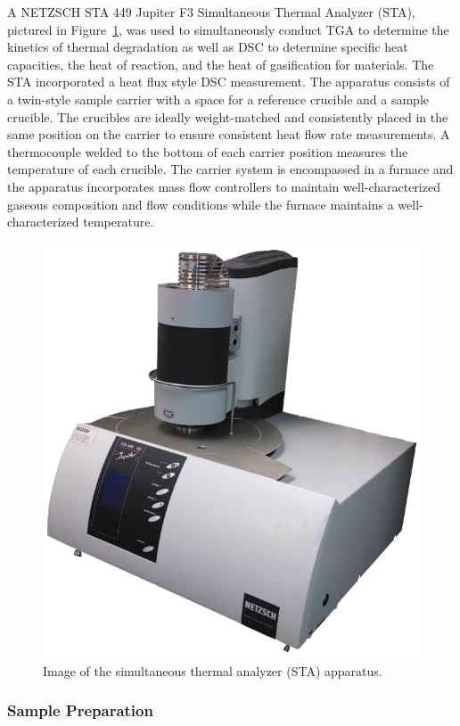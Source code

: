 \documentclass[12pt,oneside]{book}
\begin{document}
A NETZSCH STA 449 Jupiter F3 Simultaneous Thermal Analyzer (STA), pictured in Figure~\ref{fig:STA_apparatus}, was used to simultaneously conduct TGA to determine the kinetics of thermal degradation as well as DSC to determine specific heat capacities, the heat of reaction, and the heat of gasification for materials. The STA incorporated a heat flux style DSC measurement. The apparatus consists of a twin-style sample carrier with a space for a reference crucible and a sample crucible. The crucibles are ideally weight-matched and consistently placed in the same position on the carrier to ensure consistent heat flow rate measurements. A thermocouple welded to the bottom of each carrier position measures the temperature of each crucible. The carrier system is encompassed in a furnace and the apparatus incorporates mass flow controllers to maintain well-characterized gaseous composition and flow conditions while the furnace maintains a well-characterized temperature.  

\begin{figure}[!ht]
\centering
\includegraphics[width=.75\columnwidth]{Figures/STA.png}
\caption[Image of the Simultaneous Thermal Analyzer (STA) Apparatus]{Image of the simultaneous thermal analyzer (STA) apparatus.}
\label{fig:STA_apparatus}
\end{figure}

\subsubsection{Sample Preparation}
\end{document}
